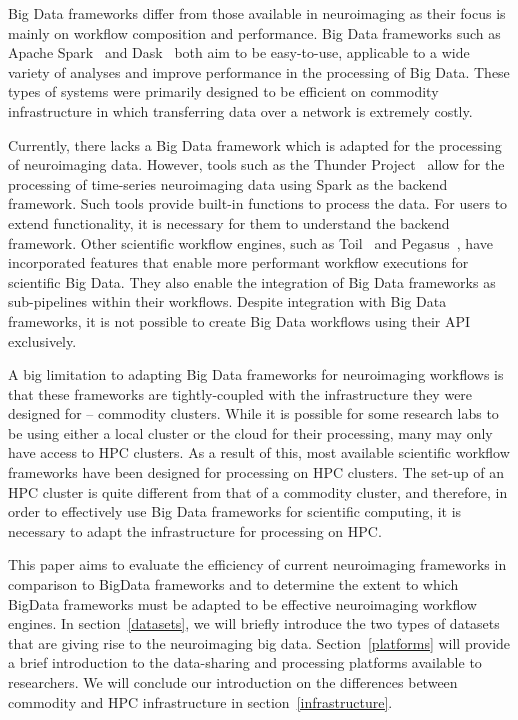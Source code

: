 \documentclass{report}
\begin{document}
        Big Data frameworks differ from those available in neuroimaging as their
        focus is mainly on workflow composition and performance. Big Data 
        frameworks such as Apache Spark~\cite{Zaharia:2016:ASU:3013530.2934664} 
        and Dask~\cite{rocklin2015dask} both aim to be easy-to-use,
        applicable to a wide variety of analyses and improve performance in the 
        processing of Big Data. These types of systems were primarily designed 
        to be efficient on commodity infrastructure in which transferring data
        over a network is extremely costly.

        Currently, there lacks a Big Data framework which is adapted for the
        processing of neuroimaging data. However, tools such as the Thunder 
        Project~\cite{Freeman:2014aa} allow for the processing of time-series
        neuroimaging data using Spark as the backend framework. Such tools
        provide built-in functions to process the data. For users to 
        extend functionality, it is necessary for them to understand the 
        backend framework. Other scientific workflow engines, such as 
        Toil~\cite{Vivian:2017aa} and Pegasus~\cite{DEELMAN201517}, have 
        incorporated features that enable more 
        performant workflow executions for scientific Big Data. They also enable
        the integration of Big Data frameworks as sub-pipelines within their 
        workflows. Despite integration with Big Data frameworks, it is not
        possible to create Big Data workflows using their API exclusively.

        A big limitation to adapting Big Data frameworks for neuroimaging 
        workflows is that these frameworks are tightly-coupled with the 
        infrastructure they were designed for -- commodity clusters. While
        it is possible for some research labs to be using either a local cluster
        or the cloud for their processing, many may only have access to HPC
        clusters. As a result of this, most available scientific workflow 
        frameworks have been designed for processing on HPC clusters. The 
        set-up of an HPC cluster is quite different from that of a commodity 
        cluster, and therefore, in order to effectively use Big Data frameworks
        for scientific computing, it is necessary to adapt the infrastructure 
        for processing on HPC.

        This paper aims to evaluate the efficiency of current neuroimaging 
        frameworks in comparison to BigData frameworks and to determine the 
        extent to which BigData frameworks must be adapted to be effective
        neuroimaging workflow engines. 
        In section~\ref{datasets}, we will briefly introduce the two 
        types of datasets that are giving rise to the neuroimaging big 
        data. Section~\ref{platforms} will provide a brief introduction 
        to the data-sharing and processing platforms available to 
        researchers. We will conclude our 
        introduction on the differences between commodity and HPC infrastructure
        in section~\ref{infrastructure}.
\end{document}
